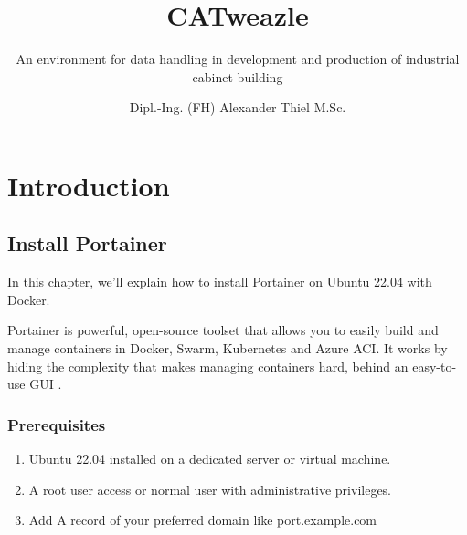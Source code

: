 \documentclass[%
	a4paper,
	oneside,
	listof=numbered,
	parskip=half,
	headsepline=true,
	footsepline=false,
	0.7headlines,
	]{scrbook}
\begin{document}
\title{CATweazle}
\subtitle{An environment for data handling in development and production of industrial cabinet building}
\subject{Industrial cabinet building}
\author{Dipl.-Ing. (FH) Alexander Thiel M.Sc.}


\maketitle
\tableofcontents

\chapter{Introduction}\label{ch:introduction}


\section{Install Portainer}\label{sec:install-portainer}

In this chapter, we’ll explain how to install Portainer on Ubuntu 22.04 with Docker.

Portainer is powerful, open-source toolset that allows you to easily build and manage
containers in Docker, Swarm, Kubernetes and Azure ACI. It works by hiding the complexity
that makes managing containers hard, behind an easy-to-use GUI .

\subsection{Prerequisites}\label{subsec:prerequisites}

\begin{enumerate}
\item Ubuntu 22.04 installed on a dedicated server or virtual machine.
\item A root user access or normal user with administrative privileges.
\item Add A record of your preferred domain like port.example.com
\end{enumerate}
\end{document}
